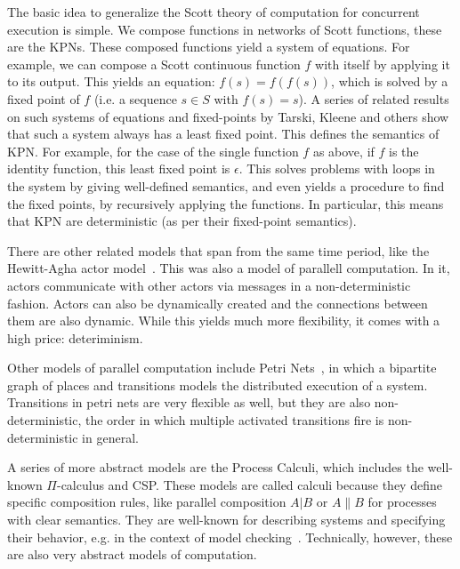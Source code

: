 The basic idea to generalize the Scott theory of computation for concurrent execution is simple.
We compose functions in networks of Scott functions, these are the \acp{KPN}.
These composed functions yield a system of equations.
For example, we can compose a Scott continuous function $f$ with itself by applying it to its output.
This yields an equation: $f(s) = f(f(s))$, which is solved by a fixed point of $f$ (i.e. a sequence $s \in S$ with $f(s)= s$).
A series of related results on such systems of equations and fixed-points by Tarski, Kleene and others show that such a system always has a least fixed point.
This defines the semantics of \ac{KPN}.
For example, for the case of the single function $f$ as above, if $f$ is the identity function, this least fixed point is $\epsilon$.
This solves problems with loops in the system by giving well-defined semantics, and even yields a procedure to find the fixed points, by recursively applying the functions.
In particular, this means that \ac{KPN} are deterministic (as per their fixed-point semantics).

There are other related models that span from the same time period, like the Hewitt-Agha actor model~\cite{DBLP:conf/ijcai/HewittBS73,Agha:86:Actors}.
This was also a model of parallell computation. In it, actors communicate with other actors via messages in a non-deterministic fashion. 
Actors can also be dynamically created and the connections between them are also dynamic.
While this yields much more flexibility, it comes with a high price: deteriminism. 

Other models of parallel computation include Petri Nets~\cite{petri1962nets}, in which a bipartite graph of places and transitions models the distributed execution of a system.
Transitions in petri nets are very flexible as well, but they are also non-deterministic, the order in which multiple activated transitions fire is non-deterministic in general.

A series of more abstract models are the Process Calculi, which includes the well-known $\Pi$-calculus and \ac{CSP}.
These models are called calculi because they define specific composition rules, like parallel composition $A | B$ or $A \| B$ for processes with clear semantics. 
They are well-known for describing systems and specifying their behavior, e.g. in the context of model checking~\cite{baier_model_checking}.
Technically, however, these are also very abstract models of computation.

